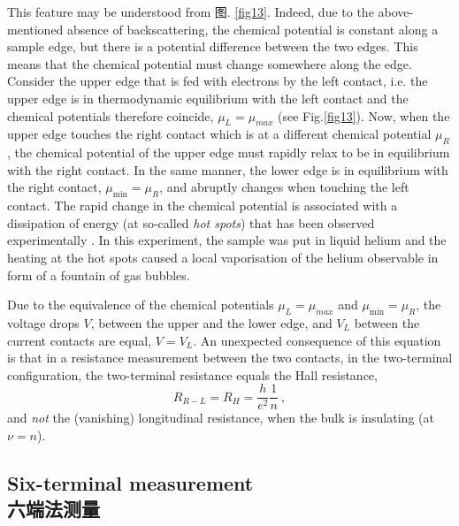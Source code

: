 \documentclass[10pt]{book}
\newcommand{\beq}{\begin{equation}}
\newcommand{\eeq}{\end{equation}}
\begin{document}
This feature may be understood from
图. \ref{fig13}. Indeed, due to the above-mentioned absence of backscattering, the chemical potential is constant along a sample
edge, but there is a potential difference between the two edges. This means that the chemical potential must change somewhere
along the edge. Consider
the upper edge that is fed with electrons by the left contact, i.e. the upper edge is in thermodynamic equilibrium with the left 
contact and the chemical potentials therefore coincide, $\mu_L=\mu_{max}$ (see Fig.\ref{fig13}). 
Now, when the upper edge touches the right contact which is at a different chemical potential $\mu_R$, 
the chemical potential of the upper edge must rapidly relax to be in equilibrium with the right contact. In the same manner, the
lower edge is in equilibrium with the right contact, $\mu_{\min}=\mu_R$, and abruptly changes when touching the left contact.
The rapid change in the chemical potential is associated with a dissipation of energy (at so-called {\sl hot spots}) 
that has been observed experimentally \cite{klass}. In this experiment, the sample was put in liquid helium and the heating
at the hot spots caused a local vaporisation of the helium observable in form of a fountain of gas bubbles. 

Due to the equivalence of the chemical potentials $\mu_L=\mu_{max}$ and $\mu_{\min}=\mu_R$, the voltage drops $V$, between the upper
and the lower edge, and $V_L$ between the current contacts are equal, $V=V_L$. An unexpected consequence of this equation is that 
in a resistance measurement between the two contacts, in the two-terminal configuration, the two-terminal resistance equals
the Hall resistance,
\beq\label{Res2Term}
R_{R-L} = R_H = \frac{h}{e^2}\frac{1}{n}\ ,
\eeq
and {\sl not} the (vanishing) longitudinal resistance, when the bulk is insulating (at $\nu=n$).

\subsection[六端法测量]{Six-terminal measurement\\\bf 六端法测量}
\label{6term}
\end{document}
